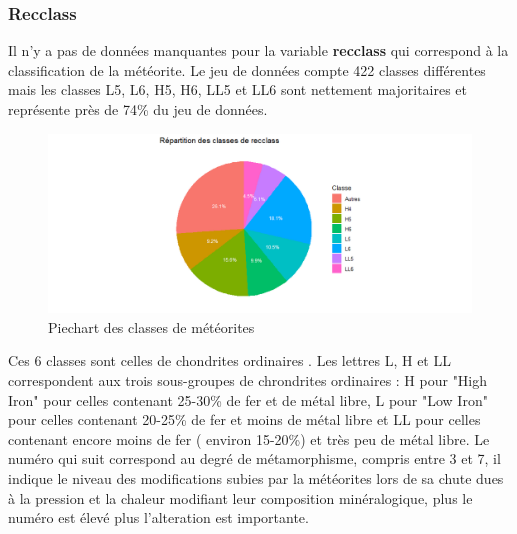 \documentclass[12pt]{article}
\begin{document}
\subsubsection*{Recclass}
Il n'y a pas de données manquantes pour la variable \textbf{recclass} qui correspond à la classification de la météorite. Le jeu de données compte 422 classes différentes mais les classes L5, L6, H5, H6, LL5 et LL6 sont nettement majoritaires et représente près de 74\% du jeu de données.
\begin{figure}[H]
\centering
\includegraphics[width=17cm]{Images/exploration/recclass_piechart_class.png}
\caption{Piechart des classes de météorites}
\end{figure}
Ces 6 classes sont celles de chondrites ordinaires \cite{Classification_meteorites}. Les lettres L, H et LL correspondent aux trois sous-groupes de chrondrites ordinaires : H pour "High Iron" pour celles contenant 25-30\% de fer et de métal libre, L pour "Low Iron" pour celles contenant 20-25\% de fer et moins de métal libre et LL pour celles contenant encore moins de fer ( environ 15-20\%) et très peu de métal libre. Le numéro qui suit correspond au degré de métamorphisme, compris entre 3 et 7, il indique le niveau des modifications subies par la météorites lors de sa chute dues à la pression et la chaleur modifiant leur composition minéralogique, plus le numéro est élevé plus l'alteration est importante.
\end{document}
